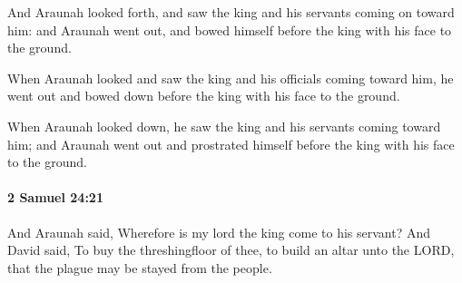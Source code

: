 			\begin{versebox}
					\item[BHS] 
					\item[ASV] And Araunah looked forth, and saw the king and his servants coming on toward him: and Araunah went out, and bowed himself before the king with his face to the ground.
					\item[NIV] When Araunah looked and saw the king and his officials coming toward him, he went out and bowed down before the king with his face to the ground.
					\item[NRSV] When Araunah looked down, he saw the king and his servants coming toward him; and Araunah went out and prostrated himself before the king with his face to the ground.
			\end{versebox}

		\paragraph{2 Samuel 24:21} %
			\label{2SAMUEL-24-21}

			And Araunah said, Wherefore is my lord the king come to his servant? And David said, To buy the threshingfloor of thee, to build an altar unto the LORD, that the plague may be stayed from the people.

